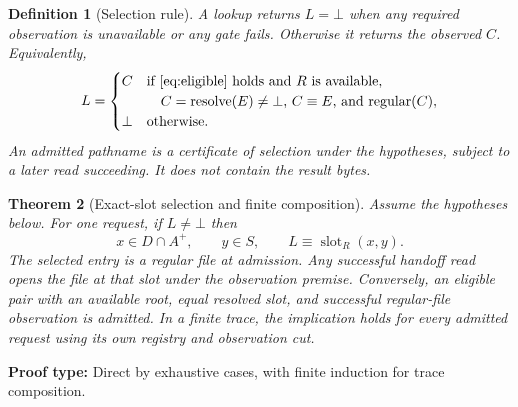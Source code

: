 \documentclass[12pt]{article}
\newtheorem{theorem}{Theorem}
\newtheorem{definition}[theorem]{Definition}
\newcommand{\denied}{\bot}
\newcommand{\regular}{\operatorname{regular}}
\newcommand{\slot}{\operatorname{slot}}
\newcommand{\resolve}{\operatorname{resolve}}
\begin{document}
\begin{definition}[Selection rule]
\label{def:rule}
A lookup returns $L=\denied$ when any required observation is
unavailable or any gate fails. Otherwise it returns the observed $C$.
Equivalently,
\begin{equation}
\label{eq:rule}
L=
\begin{cases}
C & \text{if \eqref{eq:eligible} holds and $R$ is available,}\\
  & \quad \text{$C=\resolve(E)\ne\denied$, $C\equiv E$, and $\regular(C)$},\\
\denied & \text{otherwise.}
\end{cases}
\end{equation}
An admitted pathname is a certificate of selection under the
hypotheses, subject to a later read succeeding. It does not
contain the result bytes.
\end{definition}

\begin{theorem}[Exact-slot selection and finite composition]
\label{thm:boundary}
Assume the hypotheses below. For one request, if $L\ne\denied$ then
\begin{equation}
\label{eq:claim}
x\in D\cap A^+,\qquad y\in S,\qquad L\equiv\slot_R(x,y).
\end{equation}
The selected entry is a regular file at admission. Any successful
handoff read opens the file at that slot under the observation
premise. Conversely, an eligible pair with an available root,
equal resolved slot, and successful regular-file observation is
admitted. In a finite trace, the implication holds for every
admitted request using its own registry and observation cut.
\end{theorem}

\noindent\textbf{Proof type:} Direct by exhaustive cases, with finite
induction for trace composition.
\end{document}
